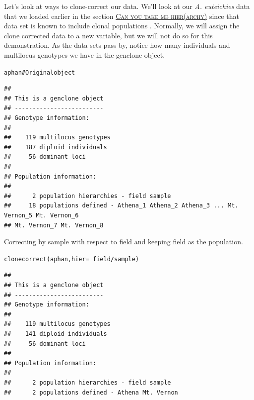 \documentclass[letterpaper]{article}\usepackage[]{graphicx}\usepackage[]{color}
\makeatletter
\newcommand{\hlcom}[1]{\textcolor[rgb]{1,0.502,0}{#1}}%
\newcommand{\hlopt}[1]{\textcolor[rgb]{1,0,0.502}{\textbf{#1}}}%
\newcommand{\hlstd}[1]{\textcolor[rgb]{0,0,0}{#1}}%
\newcommand{\hlkwc}[1]{\textcolor[rgb]{0,0.502,0.753}{#1}}%
\newcommand{\hlkwd}[1]{\textcolor[rgb]{0,0.267,0.4}{#1}}%
\newenvironment{kframe}{%
 \def\at@end@of@kframe{}%
 \ifinner\ifhmode%
  \def\at@end@of@kframe{\end{minipage}}%
  \begin{minipage}{\columnwidth}%
 \fi\fi%
 \def\FrameCommand##1{\hskip\@totalleftmargin \hskip-\fboxsep
 \colorbox{shadecolor}{##1}\hskip-\fboxsep
     \hskip-\linewidth \hskip-\@totalleftmargin \hskip\columnwidth}%
 \MakeFramed {\advance\hsize-\width
   \@totalleftmargin\z@ \linewidth\hsize
   \@setminipage}}%
 {\par\unskip\endMakeFramed%
 \at@end@of@kframe}
\newenvironment{knitrout}{}{} %
\newcommand{\seclink}[2]{
  \textsc{\hyperref[#1]{#2}}
}
\makeatother
\begin{document}
Let's look at ways to clone-correct our data. We'll look at our \textit{A. euteichies} 
data that we loaded earlier in the section\seclink{data.manip:hier}{Can you take
me hier(archy)} since that data set is known to include clonal populations 
\cite{Grunwald:2006}. Normally, we will assign the clone corrected data to a new
variable, but we will not do so for this demonstration. As the data sets pass by,
notice how many individuals and multilocus genotypes we have in the genclone
object.

\begin{knitrout}\footnotesize
{}\color{fgcolor}\begin{kframe}
\begin{alltt}
\hlstd{aphan}  \hlcom{# Original object}
\end{alltt}
\begin{verbatim}
## 
## This is a genclone object
## -------------------------
## Genotype information:
## 
##    119 multilocus genotypes
##    187 diploid individuals
##     56 dominant loci
## 
## Population information:
## 
##      2 population hierarchies - field sample
##     18 populations defined - Athena_1 Athena_2 Athena_3 ... Mt. Vernon_5 Mt. Vernon_6 
## Mt. Vernon_7 Mt. Vernon_8
\end{verbatim}
\end{kframe}
\end{knitrout}

Correcting by sample with respect to field and keeping field as the population.
\begin{knitrout}\footnotesize
{}\color{fgcolor}\begin{kframe}
\begin{alltt}
\hlkwd{clonecorrect}\hlstd{(aphan,} \hlkwc{hier} \hlstd{=} \hlopt{~}\hlstd{field}\hlopt{/}\hlstd{sample)}
\end{alltt}
\begin{verbatim}
## 
## This is a genclone object
## -------------------------
## Genotype information:
## 
##    119 multilocus genotypes
##    141 diploid individuals
##     56 dominant loci
## 
## Population information:
## 
##      2 population hierarchies - field sample
##      2 populations defined - Athena Mt. Vernon
\end{verbatim}
\end{kframe}
\end{knitrout}
\end{document}
